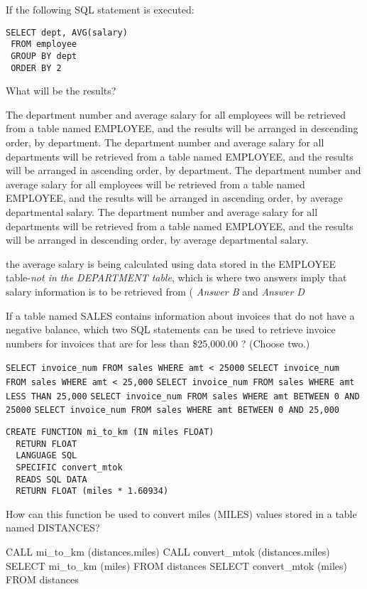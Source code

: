 \documentclass[answers, 11pt]{exam}
\begin{document}
\begin{questions}
\newpage
\question[1]
If the following SQL statement is executed:
\begin{verbatim}
SELECT dept, AVG(salary)
 FROM employee
 GROUP BY dept
 ORDER BY 2
\end{verbatim}
What will be the results?
\begin{choices}
\choice The department number and average salary for all employees will be retrieved from a table named
EMPLOYEE, and the results will be arranged in descending order, by department.
\choice The department number and average salary for all departments will be retrieved from a table named
EMPLOYEE, and the results will be arranged in ascending order, by department.
\CorrectChoice The department number and average salary for all employees will be retrieved from a table named
EMPLOYEE, and the results will be arranged in ascending order, by average departmental salary.
\choice The department number and average salary for all departments will be retrieved from a table named
EMPLOYEE, and the results will be arranged in descending order, by average departmental salary.
\end{choices}

\begin{solution}
the average salary is being calculated using data stored in the EMPLOYEE table-\textit{not in the
DEPARTMENT table}, which is where two answers imply that salary information is to be retrieved from (
\textit{Answer B} and \textit{Answer D}
\end{solution}

\question[1]
If a table named SALES contains information about invoices that do not have a negative balance, which 
two SQL statements can be used to retrieve invoice numbers for invoices that are for less than \$25,000.00
? (Choose two.)
\begin{choices}
\CorrectChoice \texttt{SELECT invoice\_num FROM sales WHERE amt < 25000}
\choice \texttt{SELECT invoice\_num FROM sales WHERE amt < 25,000}
\choice \texttt{SELECT invoice\_num FROM sales WHERE amt LESS THAN 25,000}
\CorrectChoice \texttt{SELECT invoice\_num FROM sales WHERE amt BETWEEN 0 AND 25000}
\choice \texttt{SELECT invoice\_num FROM sales WHERE amt BETWEEN 0 AND 25,000}
\end{choices}

\newpage
{}
\begin{verbatim}
CREATE FUNCTION mi_to_km (IN miles FLOAT)
  RETURN FLOAT
  LANGUAGE SQL
  SPECIFIC convert_mtok
  READS SQL DATA
  RETURN FLOAT (miles * 1.60934)
\end{verbatim}
How can this function be used to convert miles (MILES) values stored in a table named DISTANCES?
\begin{choices}
\choice CALL mi\_to\_km (distances.miles)
\choice CALL convert\_mtok (distances.miles)
\CorrectChoice SELECT mi\_to\_km (miles) FROM distances
\choice SELECT convert\_mtok (miles) FROM distances
\end{choices}


\end{questions}
\end{document}
